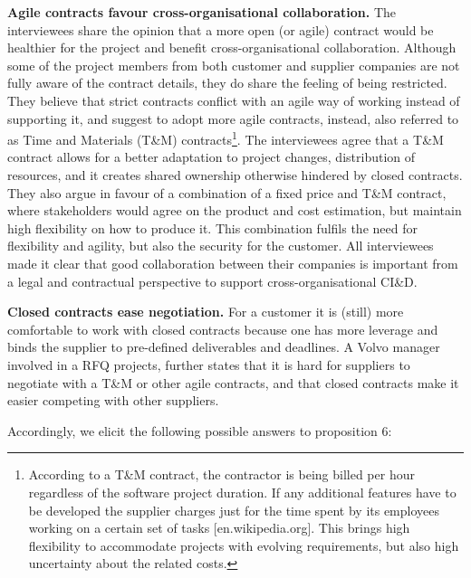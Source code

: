 {\bf Agile contracts favour cross-organisational collaboration.} The interviewees share the opinion that a more open (or agile) contract would be healthier for the project and benefit cross-organisational collaboration. Although some of the project members from both customer and supplier companies are not fully aware of the contract details, they do share the feeling of being restricted. They believe that strict contracts conflict with an agile way of working instead of supporting it, and suggest to adopt more agile contracts, instead, also referred to as Time and Materials (T\&M) contracts\footnote{According to a T\&M contract, the contractor is being billed per hour regardless of the software project duration. If any additional features have to be developed the supplier charges just for the time spent by its employees working on a certain set of tasks [en.wikipedia.org]. This brings high flexibility to accommodate projects with evolving requirements, but also high uncertainty about the related costs.}. 
The interviewees agree that a T\&M contract allows for a better adaptation to project changes, distribution of resources, and it creates shared ownership otherwise hindered by closed contracts. They also argue in favour of a combination of a fixed price and T\&M contract, where stakeholders would agree on the product and cost estimation, but maintain high flexibility on how to produce it. This combination fulfils the need for flexibility and agility, but also the security for the customer. All interviewees made it clear that good collaboration between their companies is important from a legal and contractual perspective to support cross-organisational CI\&D.

{\bf Closed contracts ease negotiation.} For a customer it is (still) more comfortable to work with closed contracts because one has more leverage and binds the supplier to pre-defined deliverables and deadlines. A Volvo manager involved in a RFQ projects, further states that it is hard for suppliers to negotiate with a T\&M or other agile contracts, and that closed contracts make it easier competing with other suppliers.

Accordingly, we elicit the following possible answers to proposition 6:

